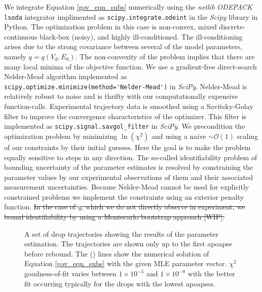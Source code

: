 \documentclass[aip,reprint, floatfix]{revtex4-1}
\begin{document}
We integrate Equation \ref{gov_eqn_subs} numerically using the \emph{netlib ODEPACK} \verb|lsoda| integrator implimented as \verb|scipy.integrate.odeint| in the \emph{Scipy} \cite{oliphant_python_2007} library in Python. The optimization problem in this case is non-convex, mixed discrete-continuous black-box (noisy), and highly ill-conditioned. The ill-conditioning arises due to the strong covariance between several of the model parameters, namely $q=q(V_d, E_0)$. The non-convexity of the problem implies that there are many local minima of the objective function. We use a gradient-free direct-search Nelder-Mead \cite{nelder_simplex_1965} algorithm implemented as \verb|scipy.optimize.minimize(method='Nelder-Mead')| in \emph{SciPy}. Nelder-Mead is relatively robust to noise and is thrifty with our computationally expensive function-calls. Experimental trajectory data is smoothed using a Savitsky-Golay filter \cite{savitzky_smoothing_1964} to improve the convergence characteristics of the optimizer. This filter is implemented as \verb|scipy.signal.savgol_filter| in \emph{SciPy}. We precondition the optimization problem by minimizing $\ln(\chi^2)$ and using a naive $\sim \mathcal{O}(1)$ scaling of our constraints by their initial guesses. Here the goal is to make the problem equally sensitive to steps in any direction. The so-called identifiability problem of bounding uncertainty of the parameter estimates is resolved by constraining the parameter values by our experimental observations of them and their associated measurement uncertainties. Because Nelder-Mead cannot be used for explicitly constrained problems we implement the constraints using an exterior penalty function. \sout{In the case of $q$, which we do not directly observe in experiment, we bound identifiability by using a Montecarlo bootstrap approach [WIP].}

\begin{figure}[h]
    \centering
    \resizebox{0.5\textwidth}{!}{}
    \caption{A set of drop trajectories showing the results of the parameter estimation. The trajectories are shown only up to the first apoapse before rebound. The (\protect\redline) \hspace{0.25 mm} lines show the numerical solution of Equation \ref{gov_eqn_subs} with the given MLE parameter vector. $\chi^2$ goodness-of-fit varies between $1 \times 10^{-5}$ and $1 \times 10^{-8}$ with the better fit occurring typically for the drops with the lowest apoapses.}
    \label{fig:inverse_problem}
\end{figure}
\end{document}

